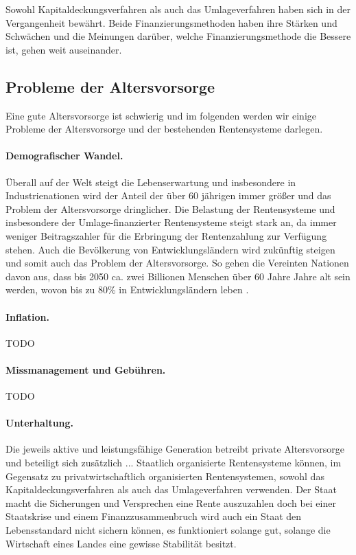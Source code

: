 Sowohl Kapitaldeckungsverfahren als auch das Umlageverfahren haben sich in der Vergangenheit bewährt. Beide Finanzierungsmethoden haben ihre Stärken und Schwächen und die Meinungen darüber, welche Finanzierungsmethode die Bessere ist, gehen weit auseinander.


\subsection{Probleme der Altersvorsorge}

Eine gute Altersvorsorge ist schwierig und im folgenden werden wir einige Probleme der Altersvorsorge und der bestehenden Rentensysteme darlegen.

\paragraph{Demografischer Wandel.} Überall auf der Welt steigt die Lebenserwartung und insbesondere in Industrienationen wird der Anteil der über 60 jährigen immer größer und das Problem der Altersvorsorge dringlicher. Die Belastung der Rentensysteme und insbesondere der Umlage-finanzierter Rentensysteme steigt stark an, da immer weniger Beitragszahler für die Erbringung der Rentenzahlung zur Verfügung stehen. Auch die Bevölkerung von Entwicklungsländern wird zukünftig steigen und somit auch das Problem der Altersvorsorge. So gehen die Vereinten Nationen davon aus, dass bis 2050 ca. zwei Billionen Menschen über 60 Jahre Jahre alt sein werden, wovon bis zu 80\% in Entwicklungsländern leben \cite{noauthor_pensions_2009}.

\paragraph{Inflation.}  TODO

\paragraph{Missmanagement und Gebühren.} TODO

\paragraph{Unterhaltung.} Die jeweils aktive und leistungsfähige Generation betreibt private Altersvorsorge und beteiligt sich zusätzlich ...
Staatlich organisierte Rentensysteme können, im Gegensatz zu privatwirtschaftlich organisierten Rentensystemen, sowohl das Kapitaldeckungsverfahren als auch das Umlageverfahren verwenden. 
Der Staat macht die Sicherungen und Versprechen eine Rente auszuzahlen doch bei einer Staatskrise und einem Finanzzusammenbruch wird auch ein Staat den Lebensstandard nicht sichern können, es funktioniert solange gut, solange die Wirtschaft eines Landes eine gewisse Stabilität besitzt.

